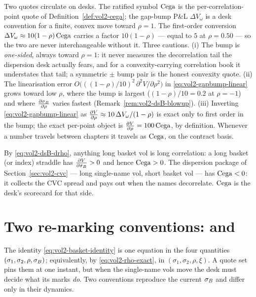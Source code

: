 \begin{remark}
\label{rem:vol2-cega-quotes}
Two quotes circulate on desks. The ratified symbol $\mathrm{Cega}$ is the
per-correlation-point quote of Definition~\ref{def:vol2-cega}; the gap-bump
P\&L $\Delta V_{\omega}$ is a desk convention for a finite, convex move
toward $\rho = 1$. The first-order conversion
$\Delta V_{\omega} \approx 10(1-\rho)\,\mathrm{Cega}$ carries a factor $10(1-\rho)$
--- equal to $5$ at $\rho = 0.50$ --- so the two are never interchangeable
without it. Three cautions. (i) The bump is \emph{one-sided}, always toward
$\rho = 1$: it never measures the decorrelation tail the dispersion desk
actually fears, and for a convexity-carrying correlation book it
understates that tail; a symmetric $\pm$ bump pair is the honest convexity
quote. (ii) The linearisation error
$O\bigl(((1-\rho)/10)^2\,\partial^2 V/\partial\rho^2\bigr)$ in
\eqref{eq:vol2-gapbump-linear} grows toward low $\rho$, where the bump is
largest ($(1-\rho)/10 = 0.2$ at $\rho = -1$) and where
$\frac{\partial \sigma_B}{\partial \rho}$ varies fastest (Remark~\ref{rem:vol2-dsB-blowup}).
(iii) Inverting \eqref{eq:vol2-gapbump-linear} as
$\frac{\partial V}{\partial \rho} \approx 10\,\Delta V_{\omega}/(1-\rho)$ is exact only to
first order in the bump; the exact per-point object is
$\frac{\partial V}{\partial \rho} = 100\,\mathrm{Cega}$, by definition. Whenever a number travels
between chapters it travels as $\mathrm{Cega}$, on the contract basis.
\end{remark}

\begin{remark}
\label{rem:vol2-cega-sign}
By \eqref{eq:vol2-dsB-drho}, anything long basket vol is long correlation: a
long basket (or index) straddle has $\frac{\partial V}{\partial \sigma_B} > 0$ and hence
$\mathrm{Cega} > 0$. The dispersion package of Section~\ref{sec:vol2-cvc} --- long
single-name vol, short basket vol --- has $\mathrm{Cega} < 0$: it collects the CVC
spread and pays out when the names decorrelate. $\mathrm{Cega}$ is the desk's
scorecard for that side.
\end{remark}

\section{Two re-marking conventions: \stickyrho{} and \stickycvc}
\label{sec:vol2-sticky}

The identity \eqref{eq:vol2-basket-identity} is one equation in the four
quantities $(\sigma_1, \sigma_2, \rho, \sigma_B)$; equivalently, by
\eqref{eq:vol2-rho-exact}, in $(\sigma_1, \sigma_2, \rho, \xi)$. A quote set
pins them at one instant, but when the single-name vols move the desk must
decide what its marks \emph{do}. Two conventions reproduce the current
$\sigma_B$ and differ only in their dynamics.

